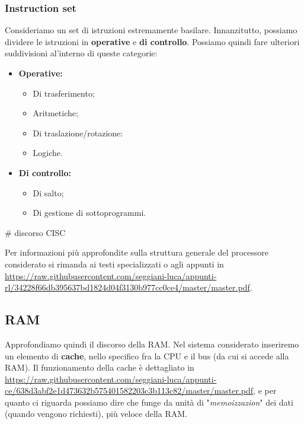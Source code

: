 \documentclass[a4paper,11pt]{article}
\begin{document}
\subsubsection{Instruction set}
Consideriamo un set di istruzioni estremamente basilare.
Innanzitutto, possiamo dividere le istruzioni in \textbf{operative} e \textbf{di controllo}.
Possiamo quindi fare ulteriori suddivisioni al'interno di queste categorie:
\begin{itemize}
	\item \textbf{Operative:}
		\begin{itemize}
			\item Di trasferimento;
			\item Aritmetiche;
			\item Di traslazione/rotazione:
			\item Logiche.
		\end{itemize}
	\item \textbf{Di controllo:}
		\begin{itemize}
			\item Di salto;
			\item Di gestione di sottoprogrammi.
		\end{itemize}
\end{itemize}

# discorso CISC

\par\medskip

Per informazioni più approfondite sulla struttura generale del processore considerato si rimanda ai testi specializzati o agli appunti in \url{https://raw.githubusercontent.com/seggiani-luca/appunti-rl/34228f66db395637bd1824d04f3130b977cc0ce4/master/master.pdf}.

\subsection{RAM}
Approfondiamo quindi il discorso della RAM.
Nel sistema considerato inseriremo un elemento di \textbf{cache}, nello specifico fra la CPU e il bus (da cui si accede alla RAM).
Il funzionamento della cache è dettagliato in \url{https://raw.githubusercontent.com/seggiani-luca/appunti-ce/638d3abf2e1d473632b575401582203c3b113c82/master/master.pdf}, e per quanto ci riguarda possiamo dire che funge da unità di "\textit{memoizzazion}" dei dati (quando vengono richiesti), più veloce della RAM.
\end{document}
